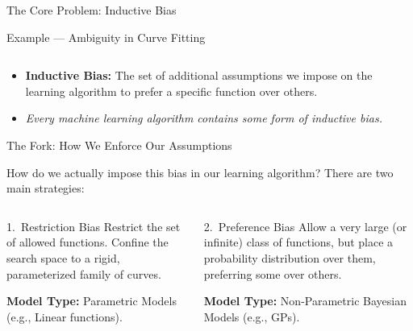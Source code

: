 \documentclass[aspectratio=169, 10pt,handout]{beamer}
\begin{document}
\begin{frame}{The Core Problem: Inductive Bias}
\begin{examplebox}{Example — Ambiguity in Curve Fitting}
\begin{columns}[T]
    \end{columns}
  \end{examplebox}
  
  

  \vspace{4pt}
  \begin{itemize}
    \item \textbf{Inductive Bias:} The set of additional assumptions we impose
      on the learning algorithm to prefer a specific function over others.
    \item \textit{Every machine learning algorithm contains some form of
      inductive bias.}
  \end{itemize}

\end{frame}

\begin{frame}{The Fork: How We Enforce Our Assumptions} 

  How do we actually impose this bias in our learning algorithm?
  There are two main strategies:

  \vspace{8pt}
  
  \begin{columns}[t]
      
      \begin{block}{1.\ Restriction Bias}
        Restrict the set of allowed functions.
        Confine the search space to a rigid,
        parameterized family of curves.

        \medskip
        \textbf{Model Type:} Parametric Models
        (e.g., Linear functions).
      \end{block}
      

      \begin{block}{2.\ Preference Bias}
        Allow a very large (or infinite) class
        of functions, but place a probability
        distribution over them, preferring some
        over others.

        \medskip
        \textbf{Model Type:} Non-Parametric
        Bayesian Models (e.g., GPs).
      \end{block}
  \end{columns}

\end{frame}
\end{document}
